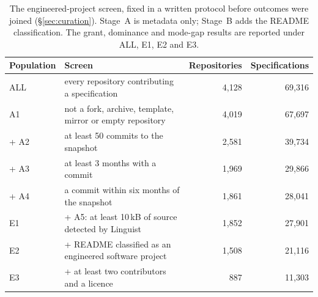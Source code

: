\begin{table}[t]
\caption{The engineered-project screen, fixed in a written protocol before outcomes were joined
(\S\ref{sec:curation}). Stage~A is metadata only; Stage~B adds the README classification. The grant, dominance and
mode-gap results are reported under ALL, E1, E2 and E3.}
\label{tab:populations}
\footnotesize
\begin{tabular}{@{}l>{\raggedright\arraybackslash}p{5.6cm}rr@{}}
\toprule
\textbf{Population} & \textbf{Screen} & \textbf{Repositories} & \textbf{Specifications} \\
\midrule
ALL & every repository contributing a specification & 4{,}128 & 69{,}316 \\
\quad A1 & not a fork, archive, template, mirror or empty repository & 4{,}019 & 67{,}697 \\
\quad + A2 & at least 50 commits to the snapshot & 2{,}581 & 39{,}734 \\
\quad + A3 & at least 3 months with a commit & 1{,}969 & 29{,}866 \\
\quad + A4 & a commit within six months of the snapshot & 1{,}861 & 28{,}041 \\
E1 & + A5: at least 10\,kB of source detected by Linguist & 1{,}852 & 27{,}901 \\
E2 & + README classified as an engineered software project & 1{,}508 & 21{,}116 \\
E3 & + at least two contributors and a licence & 887 & 11{,}303 \\
\bottomrule
\end{tabular}
\end{table}
